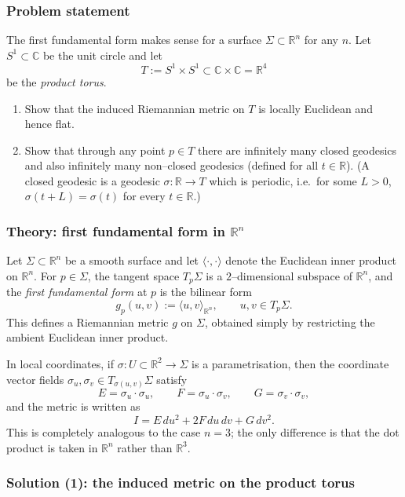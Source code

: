 \documentclass[12pt,a4paper]{article}
\theoremstyle{plain}
\theoremstyle{definition}      %
\begin{document}
\subsubsection*{Problem statement}

The first fundamental form makes sense for a surface $\Sigma\subset\mathbb{R}^{n}$
for any $n$.  Let $S^{1}\subset\mathbb{C}$ be the unit circle and let
\[
T := S^{1}\times S^{1} \subset \mathbb{C}\times\mathbb{C} = \mathbb{R}^{4}
\]
be the \emph{product torus}.

\begin{enumerate}
	\item Show that the induced Riemannian metric on $T$ is locally Euclidean
	and hence flat.
	\item Show that through any point $p\in T$ there are infinitely many closed
	geodesics and also infinitely many non--closed geodesics (defined for
	all $t\in\mathbb{R}$).  (A closed geodesic is a geodesic
	$\sigma:\mathbb{R}\to T$ which is periodic, i.e.\ for some $L>0$,
	$\sigma(t+L)=\sigma(t)$ for every $t\in\mathbb{R}$.)
\end{enumerate}

\subsubsection*{Theory: first fundamental form in $\mathbb{R}^{n}$}

Let $\Sigma\subset\mathbb{R}^{n}$ be a smooth surface and let
$\langle\cdot,\cdot\rangle$ denote the Euclidean inner product on
$\mathbb{R}^{n}$.  For $p\in\Sigma$, the tangent space $T_{p}\Sigma$ is a
$2$--dimensional subspace of $\mathbb{R}^{n}$, and the \emph{first fundamental
	form} at $p$ is the bilinear form
\[
g_{p}(u,v) := \langle u,v\rangle_{\mathbb{R}^{n}},
\qquad u,v\in T_{p}\Sigma.
\]
This defines a Riemannian metric $g$ on $\Sigma$, obtained simply by
restricting the ambient Euclidean inner product.

In local coordinates, if $\sigma:U\subset\mathbb{R}^{2}\to\Sigma$ is a
parametrisation, then the coordinate vector fields
$\sigma_{u},\sigma_{v} \in T_{\sigma(u,v)}\Sigma$ satisfy
\[
E = \sigma_{u}\cdot\sigma_{u},\qquad
F = \sigma_{u}\cdot\sigma_{v},\qquad
G = \sigma_{v}\cdot\sigma_{v},
\]
and the metric is written as
\[
I = E\,du^{2} + 2F\,du\,dv + G\,dv^{2}.
\]
This is completely analogous to the case $n=3$; the only difference is that
the dot product is taken in $\mathbb{R}^{n}$ rather than $\mathbb{R}^{3}$.

\subsubsection*{Solution (1): the induced metric on the product torus}
\end{document}
